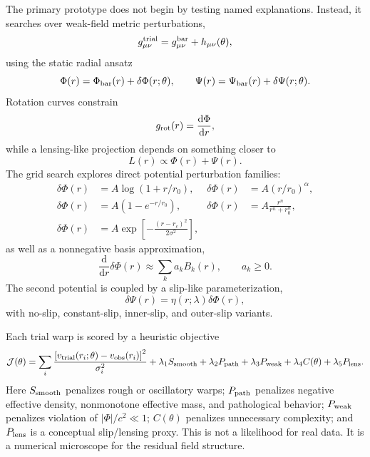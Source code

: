 \documentclass[10pt]{article}
\newcommand{\dd}{\mathrm{d}}
\begin{document}
The primary prototype does not begin by testing named explanations. Instead, it searches over weak-field metric perturbations,
\begin{equation}
g_{\mu\nu}^{\rm trial}
=
g_{\mu\nu}^{\rm bar}
+
h_{\mu\nu}(\theta),
\end{equation}
using the static radial ansatz
\begin{equation}
\Phi(r)=\Phi_{\rm bar}(r)+\delta\Phi(r;\theta),
\qquad
\Psi(r)=\Psi_{\rm bar}(r)+\delta\Psi(r;\theta).
\end{equation}
Rotation curves constrain
\begin{equation}
g_{\rm rot}(r)
=
\frac{\dd\Phi}{\dd r},
\end{equation}
while a lensing-like projection depends on something closer to
\begin{equation}
L(r)\propto \Phi(r)+\Psi(r).
\end{equation}
The grid search explores direct potential perturbation families:
\begin{align}
\delta\Phi(r)&=A\log(1+r/r_0),&
\delta\Phi(r)&=A(r/r_0)^\alpha,\\
\delta\Phi(r)&=A(1-e^{-r/r_0}),&
\delta\Phi(r)&=A\frac{r^n}{r^n+r_0^n},\\
\delta\Phi(r)&=A\exp\!\left[-\frac{(r-r_c)^2}{2\sigma^2}\right],
\end{align}
as well as a nonnegative basis approximation,
\begin{equation}
\frac{\dd}{\dd r}\delta\Phi(r)
\approx
\sum_k a_k B_k(r),
\qquad
a_k\ge0.
\end{equation}
The second potential is coupled by a slip-like parameterization,
\begin{equation}
\delta\Psi(r)=\eta(r;\lambda)\delta\Phi(r),
\end{equation}
with no-slip, constant-slip, inner-slip, and outer-slip variants.

Each trial warp is scored by a heuristic objective
\begin{equation}
\mathcal{J}(\theta)
=
\sum_i
\frac{
\left[v_{\rm trial}(r_i;\theta)-v_{\rm obs}(r_i)\right]^2
}{\sigma_i^2}
+
\lambda_1S_{\rm smooth}
+
\lambda_2P_{\rm path}
+
\lambda_3P_{\rm weak}
+
\lambda_4C(\theta)
+
\lambda_5P_{\rm lens}.
\end{equation}
Here $S_{\rm smooth}$ penalizes rough or oscillatory warps; $P_{\rm path}$ penalizes negative effective density, nonmonotone effective mass, and pathological behavior; $P_{\rm weak}$ penalizes violation of $|\Phi|/c^2\ll1$; $C(\theta)$ penalizes unnecessary complexity; and $P_{\rm lens}$ is a conceptual slip/lensing proxy. This is not a likelihood for real data. It is a numerical microscope for the residual field structure.
\end{document}
